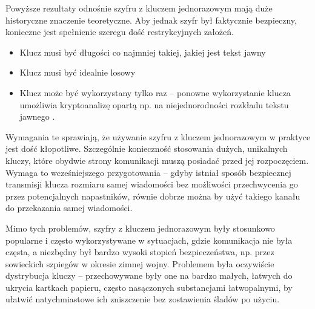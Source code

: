 \documentclass[10pt]{article}
\begin{document}
Powyższe rezultaty odnośnie szyfru z kluczem jednorazowym mają duże historyczne znaczenie teoretyczne.
Aby jednak szyfr był faktycznie bezpieczny, konieczne jest spełnienie szeregu dość restrykcyjnych
założeń.

\begin{itemize}
  \item Klucz musi być długości co najmniej takiej, jakiej jest tekst jawny
  \item Klucz musi być idealnie losowy
  \item Klucz może być wykorzystany tylko raz -- ponowne wykorzystanie klucza umożliwia kryptoanalizę
    opartą np. na niejednorodności rozkładu tekstu jawnego \footnotemark.
\end{itemize}


Wymagania te sprawiają, że używanie szyfru z kluczem jednorazowym w praktyce jest dość kłopotliwe.
Szczególnie konieczność stosowania dużych, unikalnych kluczy, które obydwie strony komunikacji muszą
posiadać przed jej rozpoczęciem. Wymaga to wcześniejszego przygotowania -- gdyby istniał sposób
bezpiecznej transmisji klucza rozmiaru samej wiadomości bez możliwości przechwycenia go przez 
potencjalnych napastników, równie dobrze można by użyć takiego kanału do przekazania samej wiadomości.

Mimo tych problemów, szyfry z kluczem jednorazowym były stosunkowo popularne i często wykorzystywane
w sytuacjach, gdzie komunikacja nie była częsta, a niezbędny był bardzo wysoki stopień bezpieczeństwa,
np. przez sowieckich szpiegów w okresie zimnej wojny. Problemem była oczywiście dystrybucja kluczy
-- przechowywane były one na bardzo małych, łatwych do ukrycia kartkach papieru, często nasączonych
substancjami łatwopalnymi, by ułatwić natychmiastowe ich zniszczenie bez zostawienia śladów po użyciu.



\nocite{*}



\end{document}
